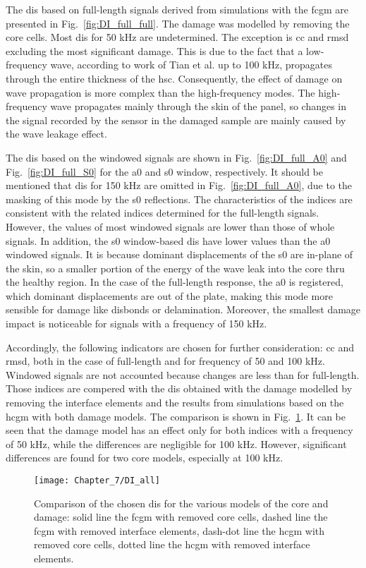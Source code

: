 The \acp{di} based on full-length signals derived from simulations with the \ac{fcgm} are presented in Fig.~\ref{fig:DI_full_full}.
The damage was modelled by removing the core cells.
Most \acp{di} for 50 \unit{\kHz} are undetermined.
The exception is \ac{cc} and \ac{rmsd} excluding the most significant damage. 
This is due to the fact that a low-frequency wave, according to work of Tian et al. \cite{tian2015wavenumber} up to 100 \unit{\kHz}, propagates through the entire thickness of the \ac{hsc}.
Consequently, the effect of damage on wave propagation is more complex than the high-frequency modes.
The high-frequency wave propagates mainly through the skin of the panel, so changes in the signal recorded by the sensor in the damaged sample are mainly caused by the wave leakage effect. 

The \acp{di} based on the windowed signals are shown in Fig.~\ref{fig:DI_full_A0} and Fig.~\ref{fig:DI_full_S0} for the \ac{a0} and \ac{s0} window, respectively.
It should be mentioned that \acp{di} for 150 \unit{\kHz} are omitted in Fig.~\ref{fig:DI_full_A0}, due to the masking of this mode by the \ac{s0} reflections.
The characteristics of the indices are consistent with the related indices determined for the full-length signals.
However, the values of most windowed signals are lower than those of whole signals.
In addition, the \ac{s0} window-based \acp{di} have lower values than the \ac{a0} windowed signals.
It is because dominant displacements of the \ac{s0} are in-plane of the skin, so a smaller portion of the energy of the wave leak into the core thru the healthy region.
In the case of the full-length response, the \ac{a0} is registered, which dominant displacements are out of the plate, making this mode more sensible for damage like disbonds or delamination.
Moreover, the smallest damage impact is noticeable for signals with a frequency of 150 \unit{\kHz}.

Accordingly, the following indicators are chosen for further consideration: \ac{cc} and \ac{rmsd}, both in the case of full-length and for frequency of 50 and 100 \unit{\kHz}.
Windowed signals are not accounted because changes are less than for full-length.
Those indices are compered with the \acp{di} obtained with the damage modelled by removing the interface elements and the results from simulations based on the \ac{hcgm} with both damage models.
The comparison is shown in Fig.~\ref{fig:DI_all}.
It can be seen that the damage model has an effect only for both indices with a frequency of 50 \unit{\kHz}, while the differences are negligible for 100 \unit{\kHz}.
However, significant differences are found for two core models, especially at 100 \unit{\kHz}.
\begin{figure}[!tbh]
	\begin{center}
		\texttt{[image: Chapter\_7/DI\_all]}
	\end{center}
	\caption{Comparison of the chosen \acfp{di} for the various models of the core and damage: solid line the \acf{fcgm} with removed core cells, dashed line the \acf{fcgm} with removed interface elements, dash-dot line the \acf{hcgm} with removed core cells, dotted line the \acf{hcgm} with removed interface elements.}
	\label{fig:DI_all}
\end{figure}
